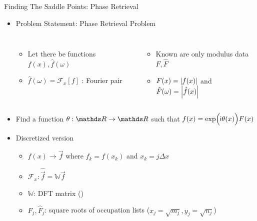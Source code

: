 
\begin{frame}{Finding The Saddle Points: Phase Retrieval}
%
\begin{itemize}
\item Problem Statement: Phase Retrieval Problem
	\vspace{-10pt}
	\begin{columns}[t]
	\begin{itemize}
	\item Let there be functions $f(x), \hat{f}(\omega)$
	\item $\hat{f}(\omega) = \mathcal{F}_x[f]$ : Fourier pair
	\end{itemize}
	\begin{itemize}
	\item Known are only modulus data $F, \hat{F}$
	\item $F(x) = \abs{f(x)}$ and $\hat{F}(\omega) = \abs{\hat{f}(x)}$
	\end{itemize}
	\end{columns}
	
\item[\Thus] Find a function $\theta: \setReals \to \setReals$ such that $f(x) = \exp(\Big. \mathsf{i} \theta(x)) F(x)$
\item Discretized version
	\begin{itemize}
	\item $f(x) \to \vec{f}$ where $f_k = f(x_k)$ and $x_k = j \Delta x$
	\item $\mathcal{F}_x : \hat{\vec{f}} = \mathbb{W} \vec{f}$
	\item $\mathbb{W}$: DFT matrix (\ie \matU)
	\item $F_j, \hat{F}_j$: square roots of occupation lists ($x_j = \sqrt{m_j}, y_j = \sqrt{n_j}$)
	\end{itemize}
\end{itemize}
%
\end{frame}


